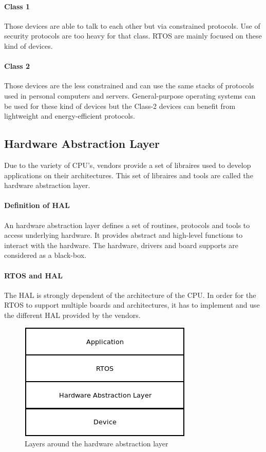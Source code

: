 \paragraph{Class 1}
Those devices are able to talk to each other but via constrained protocols.
Use of security protocols are too heavy for that class.
RTOS are mainly focused on these kind of devices.

\paragraph{Class 2}
Those devices are the less constrained and can use the same stacks of protocols used in personal computers and servers.
General-purpose operating systems can be used for these kind of devices but the Class-2 devices can benefit from lightweight and energy-efficient protocols.

\subsection{Hardware Abstraction Layer}

Due to the variety of CPU's, vendors provide a set of libraires used to develop applications on their architectures.
This set of libraires and tools are called the hardware abstraction layer.

\paragraph{Definition of HAL}
An hardware abstraction layer defines a set of routines, protocols and tools to access underlying hardware.
It provides abstract and high-level functions to interact with the hardware.
The hardware, drivers and board supports are considered as a black-box.

\paragraph{RTOS and HAL}
The HAL is strongly dependent of the architecture of the CPU.
In order for the RTOS to support multiple boards and architectures, it has to implement and use the different HAL provided by the vendors.

\begin{figure}[!h]
  \centering
  \includegraphics[scale=0.7]{assets/hal-layers.png}
  \caption{\label{fig:hal-layer}Layers around the hardware abstraction layer}
\end{figure}

